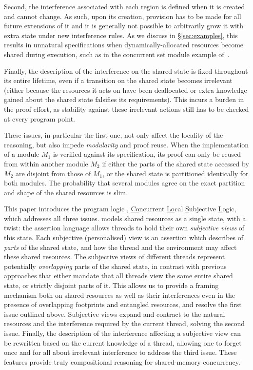 Second, the interference associated with each region is defined when
it is created and cannot change. As such, upon its creation, provision
has to be made for all future extensions of it and it is generally not
possible to arbitrarily grow it with extra state under new
interference rules.  As we discuss in \S\ref{sec:examples}, this
results in unnatural specifications when dynamically-allocated
resources become shared during execution, such as in the concurrent
set module example of~\cite{cap-ecoop10}.

Finally, the description of the interference on the shared state is
fixed throughout its entire lifetime, even if a transition on the shared state 
becomes irrelevant (either because the resources it acts on have been
deallocated or extra knowledge gained about the shared state
falsifies its requirements). This incurs
a burden in the proof effort, as stability against these irrelevant
actions still has to be checked at every program point.

These issues, in particular the first one, not only affect the
locality of the reasoning, but also impede \emph{modularity} and proof
reuse. When the implementation of a module $M_1$ is verified against
its specification, its proof can only be reused from within another
module $M_2$ if either the parts of the shared state accessed by $M_2$
are disjoint from those of $M_1$, or the shared state is partitioned
identically for both modules. The probability that several modules
agree on the exact partition and shape of the shared resources is slim.

This paper introduces the program logic \colosl,
\underline{Co}ncurrent \underline{Lo}cal \underline{S}ubjective
\underline{L}ogic, which addresses all three issues. \colosl models
shared resources as a single state, with a twist: the assertion
language allows threads to hold their own \emph{subjective views} of
this state. Each subjective (personalised) view is an assertion which
describes of \emph{parts} of the shared state, and how the thread and
the environment may affect these shared resources.  The subjective
views of different threads represent potentially \emph{overlapping}
parts of the shared state, in contrast with previous approaches that
either mandate that all threads view the same entire shared state, or
strictly disjoint parts of it. This allows us to provide a framing
mechanism both on shared resources as well as their interferences even
in the presence of overlapping footprints and entangled resources, and
resolve the first issue outlined above. Subjective views expand and
contract to the natural resources and the interference required by the
current thread, solving the second issue. Finally, the description of
the interference affecting a subjective view can be rewritten based on
the current knowledge of a thread, allowing one to forget once and for
all about irrelevant interference to address the third issue. These
features provide truly compositional reasoning for shared-memory
concurrency.


